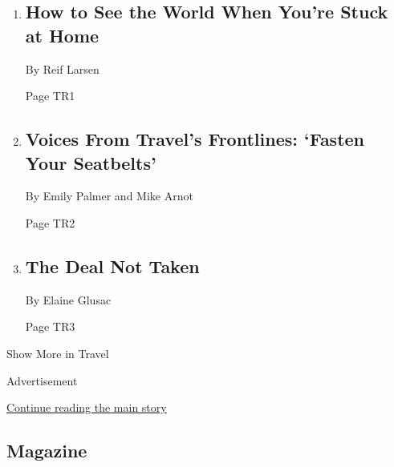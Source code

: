 \begin{enumerate}
\def\labelenumi{\arabic{enumi}.}
\item
  \href{/2020/03/24/travel/coronavirus-virtual-travel.html}{}

  \hypertarget{how-to-see-the-world-when-youre-stuck-at-home-1}{%
  \subsection{How to See the World When You're Stuck at
  Home}\label{how-to-see-the-world-when-youre-stuck-at-home-1}}

  By Reif Larsen

  Page TR1
\item
  \href{/2020/03/25/travel/coronavirus-travel-hospitality-workers.html}{}

  \hypertarget{voices-from-travels-frontlines-fasten-your-seatbelts}{%
  \subsection{Voices From Travel's Frontlines: `Fasten Your
  Seatbelts'}\label{voices-from-travels-frontlines-fasten-your-seatbelts}}

  By Emily Palmer and Mike Arnot

  Page TR2
\item
  \href{/2020/03/21/travel/budget-travel-coronavirus.html}{}

  \hypertarget{the-deal-not-taken}{%
  \subsection{The Deal Not Taken}\label{the-deal-not-taken}}

  By Elaine Glusac

  Page TR3
\end{enumerate}

Show More in Travel

Advertisement

\protect\hyperlink{after-mid5}{Continue reading the main story}

\hypertarget{magazine}{%
\subsection{Magazine}\label{magazine}}

